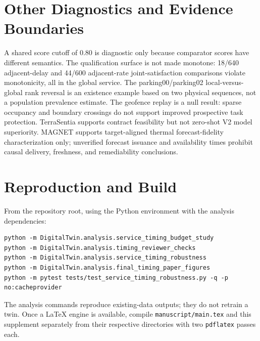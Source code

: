 \documentclass[journal,onecolumn]{IEEEtran}
\begin{document}
\section{Other Diagnostics and Evidence Boundaries}
A shared score cutoff of 0.80 is diagnostic only because comparator scores have different semantics. The qualification surface is not made monotone: 18/640 adjacent-delay and 44/600 adjacent-rate joint-satisfaction comparisons violate monotonicity, all in the global service. The parking00/parking02 local-versus-global rank reversal is an existence example based on two physical sequences, not a population prevalence estimate. The geofence replay is a null result: sparse occupancy and boundary crossings do not support improved prospective task protection. TerraSentia supports contract feasibility but not zero-shot V2 model superiority. MAGNET supports target-aligned thermal forecast-fidelity characterization only; unverified forecast issuance and availability times prohibit causal delivery, freshness, and remediability conclusions.

\section{Reproduction and Build}
From the repository root, using the Python environment with the analysis dependencies:
\begin{verbatim}
python -m DigitalTwin.analysis.service_timing_budget_study
python -m DigitalTwin.analysis.timing_reviewer_checks
python -m DigitalTwin.analysis.service_timing_robustness
python -m DigitalTwin.analysis.final_timing_paper_figures
python -m pytest tests/test_service_timing_robustness.py -q -p no:cacheprovider
\end{verbatim}
The analysis commands reproduce existing-data outputs; they do not retrain a twin. Once a LaTeX engine is available, compile \texttt{manuscript/main.tex} and this supplement separately from their respective directories with two \texttt{pdflatex} passes each.
\end{document}
